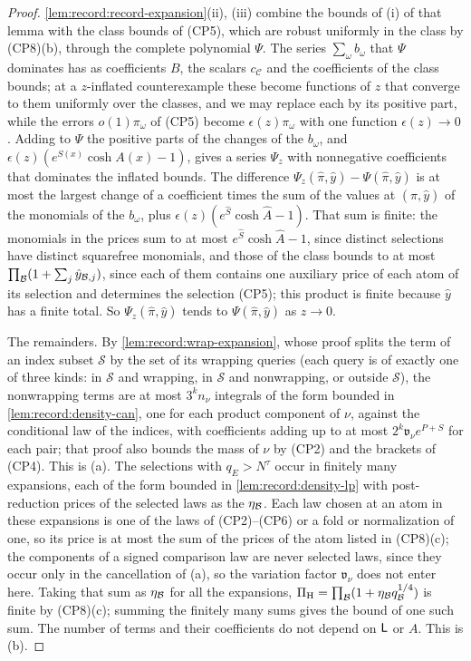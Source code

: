 \begin{proof}
\cref{lem:record:record-expansion}(ii), (iii) combine the bounds of (i) of
that lemma with the class bounds of (CP5), which are robust uniformly in the
class by (CP8)(b), through the complete polynomial $\Psi$. The series
$\sum_\omega b_\omega$ that $\Psi$ dominates has as coefficients $B$, the scalars $c_{\mathcal C}$ and the coefficients of the class bounds; at a $z$-inflated
counterexample these become functions of $z$ that converge to them uniformly
over the classes, and we may replace each by its positive part, while the
errors $o(1)\pi_\omega$ of (CP5) become $\epsilon(z)\pi_\omega$ with one function
$\epsilon(z)\to0$. Adding to $\Psi$ the positive parts of the changes of the
$b_\omega$, and $\epsilon(z)(e^{S(x)}\cosh A(x)-1)$, gives a series $\Psi_z$
with nonnegative coefficients that dominates the inflated bounds. The
difference $\Psi_z(\hat\pi,\hat y)-\Psi(\hat\pi,\hat y)$ is at most the
largest change of a coefficient times the sum of the values at $(\hat\pi,\hat
y)$ of the monomials of the $b_\omega$, plus $\epsilon(z)(e^{\hat S}\cosh\hat
A-1)$. That sum is finite: the monomials in the prices sum to at most
$e^{\hat S}\cosh\hat A-1$, since distinct selections have distinct squarefree
monomials, and those of the class bounds to at most
$\prod_\mathcal B(1+\sum_j\hat y_{\mathcal B,j})$, since each of them contains one auxiliary
price of each atom of its selection and determines the selection (CP5); this
product is finite because $\hat y$ has a finite total. So $\Psi_z(\hat\pi,\hat
y)$ tends to $\Psi(\hat\pi,\hat y)$ as $z\to0$.

The remainders. By \cref{lem:record:wrap-expansion}, whose proof splits the
term of an index subset $\mathcal S$ by the set of its wrapping
queries (each query is of exactly one of three kinds: in
$\mathcal S$ and wrapping, in $\mathcal S$ and nonwrapping, or
outside $\mathcal S$), the nonwrapping terms are at most
$3^kn_\nu$ integrals of the
form bounded in \cref{lem:record:density-can}, one for each product component
of $\nu$, against the conditional law of the indices, with coefficients
adding up to at most $2^k\mathfrak v_\nu e^{P+S}$ for each pair; that proof
also bounds the mass of $\nu$ by (CP2) and the brackets of (CP4). This is
(a). The
selections with $q_E>N^\tau$ occur in finitely many expansions, each of the
form bounded in \cref{lem:record:density-lp} with post-reduction prices of
the selected laws as the $\eta_{\mathcal B}$. Each law chosen at an atom in these expansions is one
of the laws of (CP2)--(CP6) or a fold or normalization of one, so its price
is at most the sum of the prices of the atom listed in (CP8)(c); the
components of a signed comparison law are never selected laws, since they
occur only in the cancellation of (a), so the variation factor $\mathfrak
v_\nu$ does not enter here. Taking that
sum as $\eta_{\mathcal B}$ for all the expansions,
$\Pi_{\rm H}=\prod_{\mathcal B}(1+\eta_{\mathcal B}q_{\mathcal B}^{1/4})$ is finite by (CP8)(c);
summing the finitely many sums gives the bound of one such sum. The number of
terms and their coefficients do not depend on $\mathsf L$ or $A$. This is (b).


\end{proof}
